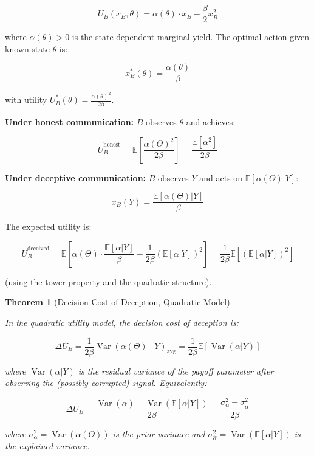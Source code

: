 \documentclass[11pt]{article}
\theoremstyle{plain}
\newtheorem{theorem}{Theorem}
\theoremstyle{definition}
\theoremstyle{remark}
\begin{document}
\[U_B(x_B, \theta) = \alpha(\theta) \cdot x_B - \frac{\beta}{2} x_B^2\]

where \(\alpha(\theta) > 0\) is the state-dependent marginal yield. The
optimal action given known state \(\theta\) is:

\[x_B^*(\theta) = \frac{\alpha(\theta)}{\beta}\]

with utility \(U_B^*(\theta) = \frac{\alpha(\theta)^2}{2\beta}\).

\textbf{Under honest communication:} \(B\) observes \(\theta\) and
achieves:

\[\bar{U}_B^{\text{honest}} = \mathbb{E}\left[\frac{\alpha(\Theta)^2}{2\beta}\right] = \frac{\mathbb{E}[\alpha^2]}{2\beta}\]

\textbf{Under deceptive communication:} \(B\) observes \(Y\) and acts on
\(\mathbb{E}[\alpha(\Theta) | Y]\):

\[x_B(Y) = \frac{\mathbb{E}[\alpha(\Theta) | Y]}{\beta}\]

The expected utility is:

\[\bar{U}_B^{\text{deceived}} = \mathbb{E}\left[\alpha(\Theta) \cdot \frac{\mathbb{E}[\alpha | Y]}{\beta} - \frac{1}{2\beta}\left(\mathbb{E}[\alpha | Y]\right)^2\right] = \frac{1}{2\beta}\mathbb{E}\left[\left(\mathbb{E}[\alpha | Y]\right)^2\right]\]

(using the tower property and the quadratic structure).

\begin{theorem}[Decision Cost of Deception, Quadratic Model]
\label{thm-decision-cost-quadratic}

In the quadratic utility model, the decision cost of deception is:

$$\Delta U_B = \frac{1}{2\beta} \operatorname{Var}\left(\alpha(\Theta) \mid Y\right)_{\text{avg}} = \frac{1}{2\beta}\mathbb{E}\left[\operatorname{Var}(\alpha | Y)\right]$$

where $\operatorname{Var}(\alpha | Y)$ is the residual variance of the payoff parameter after observing the (possibly corrupted) signal. Equivalently:

$$\Delta U_B = \frac{\operatorname{Var}(\alpha) - \operatorname{Var}(\mathbb{E}[\alpha | Y])}{2\beta} = \frac{\sigma_\alpha^2 - \sigma_{\hat{\alpha}}^2}{2\beta}$$

where $\sigma_\alpha^2 = \operatorname{Var}(\alpha(\Theta))$ is the prior variance and $\sigma_{\hat{\alpha}}^2 = \operatorname{Var}(\mathbb{E}[\alpha | Y])$ is the explained variance.
\end{theorem}
\end{document}
